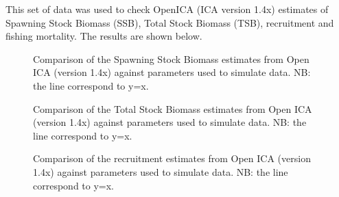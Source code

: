 This set of data was used to check OpenICA (ICA version 1.4x) estimates of Spawning Stock Biomass (SSB), Total Stock Biomass (TSB), recruitment and fishing mortality. The results are shown below.

\begin{figure}
	\begin{center}
	\end{center}
	\caption{Comparison of the Spawning Stock Biomass estimates from Open ICA (version 1.4x) against parameters used to simulate data. NB: the line correspond to y=x.}
\end{figure}

 \begin{figure}
  	\begin{center}
  	\end{center}
  	\caption{Comparison of the Total Stock Biomass estimates from Open ICA (version 1.4x) against parameters used to simulate data. NB: the line correspond to y=x.}
  \end{figure}

  \begin{figure}
  	\begin{center}
  	\end{center}
  	\caption{Comparison of the recruitment estimates from Open ICA (version 1.4x) against parameters used to simulate data. NB: the line correspond to y=x.}
  \end{figure}


